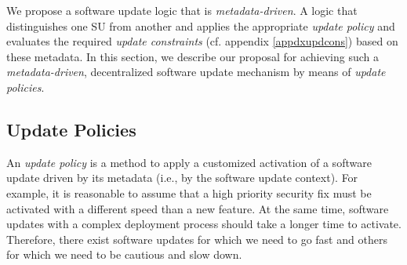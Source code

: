 We propose a software update logic that is \emph{metadata-driven}. A logic that distinguishes one SU from another and applies the appropriate \emph{update policy} and evaluates the required \emph{update constraints} (cf. appendix \ref{appdxupdcons}) based on these metadata. 
In this section, we describe our proposal for achieving such a \emph{metadata-driven}, decentralized software update mechanism by means of \emph{update policies}.



\subsection{Update Policies} 

An \emph{update policy} is a method to apply a customized activation of a software update driven by its metadata (i.e., by the software update context). For example, it is reasonable to assume that a high priority security fix must be activated with a different speed than a  new feature. At the same time, 
 software updates with a complex deployment process should take a longer time to activate. Therefore, there exist software updates for which we need to go fast and others for which we need to be cautious and slow down.

